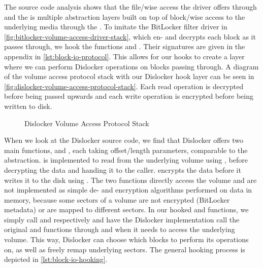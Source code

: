 The source code analysis shows that the file\-/wise access the driver offers through  and the  is multiple abstraction layers built on top of block\-/wise access to the underlying media through the .
To imitate the BitLocker filter driver in \autoref{fig:bitlocker-volume-access-driver-stack}, which en- and decrypts each block as it passes through, we hook the  functions  and . Their signatures are given in the appendix in \autoref{lst:block-io-protocol}.
This allows for our hooks to create a layer where we can perform Dislocker operations on blocks passing through.
A diagram of the volume access protocol stack with our Dislocker hook layer can be seen in \autoref{fig:dislocker-volume-access-protocol-stack}.
Each read operation is decrypted before being passed upwards and each write operation is encrypted before being written to disk.

\begin{figure}[htb]%
    \centering
    
    \caption{Dislocker Volume Access Protocol Stack}%
    \label{fig:dislocker-volume-access-protocol-stack}%
\end{figure}

When we look at the Dislocker source code, we find that Dislocker offers two main functions,  and , each taking offset\-/length parameters, comparable to the  abstraction.
 is implemented to read from the underlying volume using , before decrypting the data and handing it to the caller.
 encrypts the data before it writes it to the disk using .
The two functions directly access the volume and are not implemented as simple de- and encryption algorithms performed on data in memory, because some sectors of a volume are not encrypted (BitLocker metadata) or are mapped to different sectors.
In our hooked  and  functions, we simply call  and  respectively and have the Dislocker implementation call the original  and  functions through  and  when it needs to access the underlying volume.
This way, Dislocker can choose which blocks to perform its operations on, as well as freely remap underlying sectors.
The general hooking process is depicted in \autoref{lst:block-io-hooking}.

